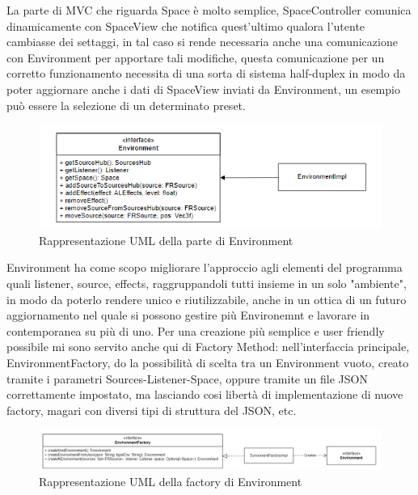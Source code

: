 \documentclass[a4paper,12pt]{report}
\begin{document}
La parte di MVC che riguarda Space è molto semplice, SpaceController comunica dinamicamente con SpaceView che notifica quest'ultimo qualora l'utente cambiasse dei settaggi, in tal caso si rende necessaria anche una comunicazione con Environment per apportare tali modifiche, questa comunicazione per un corretto funzionamento necessita di una sorta di sistema half-duplex in modo da poter aggiornare anche i dati di SpaceView inviati da Environment, un esempio può essere la selezione di un determinato preset.
%
\begin{figure}[H]
\centering{}
\includegraphics[width=\textwidth]{img/environment/Environment.png}
\caption{Rappresentazione UML della parte di Environment}
\label{img:environment}
\end{figure}
Environment ha come scopo migliorare l'approccio agli elementi del programma quali listener, source, effects, raggruppandoli tutti insieme in un solo "ambiente", in modo da poterlo rendere unico e riutilizzabile, anche in un ottica di un futuro aggiornamento nel quale si possono gestire più Environemnt e lavorare in contemporanea su più di uno.
Per una creazione più semplice e user friendly possibile mi sono servito anche qui di Factory Method: nell'interfaccia principale, EnvironmentFactory, do la possibilità di scelta tra un Environment vuoto, creato tramite i parametri Sources-Listener-Space, oppure tramite un file JSON correttamente impostato, ma lasciando cosi libertà di implementazione di nuove factory, magari con diversi tipi di struttura del JSON, etc.
%
\begin{figure}[H]
\centering{}
\includegraphics[width=\textwidth]{img/environment/EnvironmentFactory.png}
\caption{Rappresentazione UML della factory di Environment}
\label{img:environmentfactory}
\end{figure}
\end{document}
